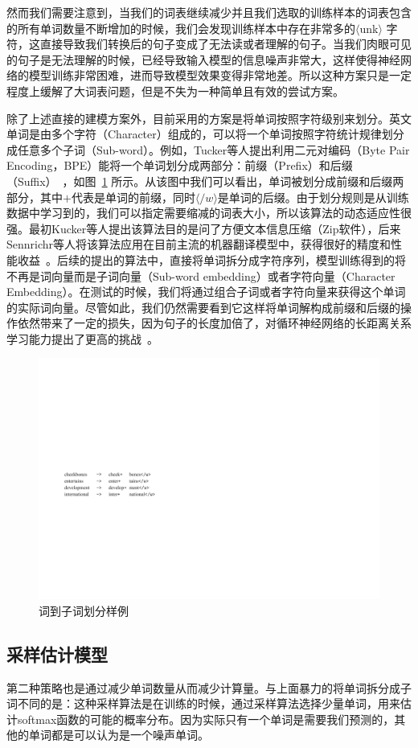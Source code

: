 然而我们需要注意到，当我们的词表继续减少并且我们选取的训练样本的词表包含的所有单词数量不断增加的时候，我们会发现训练样本中存在非常多的$\langle$unk$\rangle$ 字符，这直接导致我们转换后的句子变成了无法读或者理解的句子。当我们肉眼可见的句子是无法理解的时候，已经导致输入模型的信息噪声非常大，这样使得神经网络的模型训练非常困难，进而导致模型效果变得非常地差。所以这种方案只是一定程度上缓解了大词表问题，但是不失为一种简单且有效的尝试方案。

除了上述直接的建模方案外，目前采用的方案是将单词按照字符级别来划分。英文单词是由多个字符（Character）组成的，可以将一个单词按照字符统计规律划分成任意多个子词（Sub-word）。例如，Tucker等人提出利用二元对编码（Byte Pair Encoding，BPE）能将一个单词划分成两部分：前缀（Prefix）和后缀（Suffix）~，如图~\ref{fig:subword} 所示。从该图中我们可以看出，单词被划分成前缀和后缀两部分，其中$+$代表是单词的前缀，同时$\langle /w \rangle$是单词的后缀。由于划分规则是从训练数据中学习到的，我们可以指定需要缩减的词表大小，所以该算法的动态适应性很强。最初Kucker等人提出该算法目的是问了方便文本信息压缩（Zip软件），后来Sennrichr等人将该算法应用在目前主流的机器翻译模型中，获得很好的精度和性能收益~。后续的提出的算法中，直接将单词拆分成字符序列，模型训练得到的将不再是词向量而是子词向量（Sub-word embedding）或者字符向量（Character Embedding）。在测试的时候，我们将通过组合子词或者字符向量来获得这个单词的实际词向量。尽管如此，我们仍然需要看到它这样将单词解构成前缀和后缀的操作依然带来了一定的损失，因为句子的长度加倍了，对循环神经网络的长距离关系学习能力提出了更高的挑战~。

\begin{figure}[!h]
  \centering
\includegraphics[width=0.58\linewidth]{./figures/subword.pdf}
\caption{词到子词划分样例}\label{fig:subword}
\end{figure}

\subsection{采样估计模型}
第二种策略也是通过减少单词数量从而减少计算量。与上面暴力的将单词拆分成子词不同的是：这种采样算法是在训练的时候，通过采样算法选择少量单词，用来估计softmax函数的可能的概率分布。因为实际只有一个单词是需要我们预测的，其他的单词都是可以认为是一个噪声单词。


